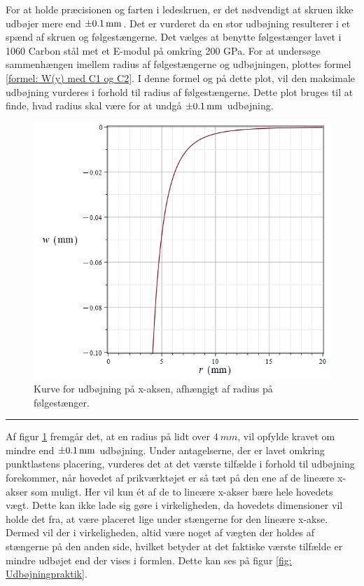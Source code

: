 For at holde præcisionen og farten i ledeskruen, er det nødvendigt at skruen ikke udbøjer mere end \(\SI{\pm0,1}{mm}\). Det er vurderet da en stor udbøjning resulterer i et spænd af skruen og følgestængerne. Det vælges at benytte følgestænger lavet i 1060 Carbon stål met et E-modul på omkring 200 GPa. For at undersøge sammenhængen imellem radius af følgestængerne og udbøjningen, plottes formel \ref{formel: W(y) med C1 og C2}. I denne formel og på dette plot, vil den maksimale udbøjning vurderes i forhold til radius af følgestængerne. Dette plot bruges til at finde, hvad radius skal være for at undgå \(\SI{\pm0,1}{mm}\) udbøjning.

\begin{figure}[H]
    \centering
    \includegraphics[width=0.7\linewidth]{Sections/6 Detaljeløsning/Media/Udbøjning ifht. r.png}
    \caption{Kurve for udbøjning på x-aksen, afhængigt af radius på følgestænger.}
    \label{fig: Udbøjninggraf}
\end{figure} \plainbreak{-0.5}

Af figur \ref{fig: Udbøjninggraf} fremgår det, at en radius på lidt over $\SI{4}{mm}$, vil opfylde kravet om mindre end $\SI{\pm 0,1}{mm}$ udbøjning. Under antagelserne, der er lavet omkring punktlastens placering, vurderes det at det værste tilfælde i forhold til udbøjning forekommer, når hovedet af prikværktøjet er så tæt på den ene af de lineære x-akser som muligt. Her vil kun ét af de to lineære x-akser bære hele hovedets vægt. Dette kan ikke lade sig gøre i virkeligheden, da hovedets dimensioner vil holde det fra, at være placeret lige under stængerne for den lineære x-akse. Dermed vil der i virkeligheden, altid være noget af vægten der holdes af stængerne på den anden side, hvilket betyder at det faktiske værste tilfælde er mindre udbøjet end der vises i formlen. Dette kan ses på figur \ref{fig: Udbøjningpraktik}.

